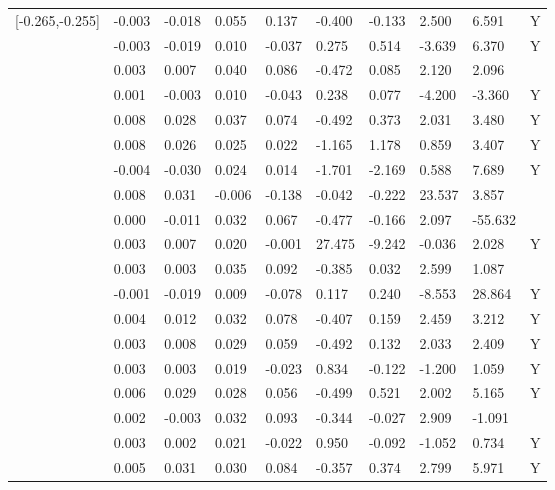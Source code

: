 \begin{table}[ht]
\begin{tabular}{llllllllll}
  [-0.265,-0.255] & -0.003 & -0.018 &  0.055 &  0.137 &  -0.400 &  -0.133 &   2.500 &   6.591 & Y \\ 
  [-0.255,-0.245] & -0.003 & -0.019 &  0.010 & -0.037 &   0.275 &   0.514 &  -3.639 &   6.370 & Y \\ 
  [-0.245,-0.235] &  0.003 &  0.007 &  0.040 &  0.086 &  -0.472 &   0.085 &   2.120 &   2.096 &  \\ 
  [-0.235,-0.225] &  0.001 & -0.003 &  0.010 & -0.043 &   0.238 &   0.077 &  -4.200 &  -3.360 & Y \\ 
  [-0.225,-0.215] &  0.008 &  0.028 &  0.037 &  0.074 &  -0.492 &   0.373 &   2.031 &   3.480 & Y \\ 
  [-0.215,-0.205] &  0.008 &  0.026 &  0.025 &  0.022 &  -1.165 &   1.178 &   0.859 &   3.407 & Y \\ 
  [-0.205,-0.195] & -0.004 & -0.030 &  0.024 &  0.014 &  -1.701 &  -2.169 &   0.588 &   7.689 & Y \\ 
  [-0.195,-0.185] &  0.008 &  0.031 & -0.006 & -0.138 &  -0.042 &  -0.222 &  23.537 &   3.857 &  \\ 
  [-0.185,-0.175] &  0.000 & -0.011 &  0.032 &  0.067 &  -0.477 &  -0.166 &   2.097 & -55.632 &  \\ 
  [-0.175,-0.165] &  0.003 &  0.007 &  0.020 & -0.001 &  27.475 &  -9.242 &  -0.036 &   2.028 & Y \\ 
  [-0.165,-0.155] &  0.003 &  0.003 &  0.035 &  0.092 &  -0.385 &   0.032 &   2.599 &   1.087 &  \\ 
  [-0.155,-0.145] & -0.001 & -0.019 &  0.009 & -0.078 &   0.117 &   0.240 &  -8.553 &  28.864 & Y \\ 
  [-0.145,-0.135] &  0.004 &  0.012 &  0.032 &  0.078 &  -0.407 &   0.159 &   2.459 &   3.212 & Y \\ 
  [-0.135,-0.125] &  0.003 &  0.008 &  0.029 &  0.059 &  -0.492 &   0.132 &   2.033 &   2.409 & Y \\ 
  [-0.125,-0.115] &  0.003 &  0.003 &  0.019 & -0.023 &   0.834 &  -0.122 &  -1.200 &   1.059 & Y \\ 
  [-0.115,-0.105] &  0.006 &  0.029 &  0.028 &  0.056 &  -0.499 &   0.521 &   2.002 &   5.165 & Y \\ 
  [-0.105,-0.095] &  0.002 & -0.003 &  0.032 &  0.093 &  -0.344 &  -0.027 &   2.909 &  -1.091 &  \\ 
  [-0.095,-0.085] &  0.003 &  0.002 &  0.021 & -0.022 &   0.950 &  -0.092 &  -1.052 &   0.734 & Y \\ 
  [-0.085,-0.075] &  0.005 &  0.031 &  0.030 &  0.084 &  -0.357 &   0.374 &   2.799 &   5.971 & Y \\ 

\end{tabular}
\end{table}
